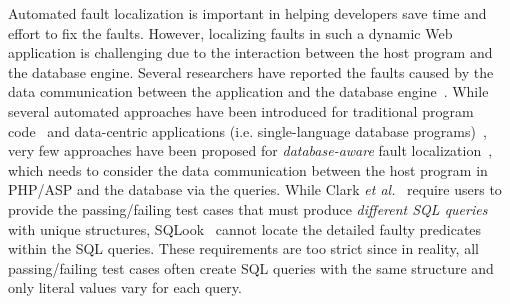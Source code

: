 Automated fault localization is important in helping developers save
time and effort to fix the faults. However, localizing faults in such
a dynamic Web application is challenging due to the interaction
between the host program and the database engine.
Several researchers have reported the faults caused by the data
communication between the application and the database
engine~\cite{ga-ase11,brooks-icst09}. While several automated
approaches have been introduced for traditional program
code~\cite{abreu-ochiai-07, tarantula05,liblit-pldi05} and
data-centric applications (i.e. single-language database
programs)~\cite{dor-issta08,litvak10,saha11}, very few approaches have
been proposed for {\em database-aware} fault
localization~\cite{ga-ase11,icsm13}, which needs to consider the data
communication between the host program in PHP/ASP and the database via
the queries. While Clark {\em et al.}~\cite{ga-ase11} require users to
provide the passing/failing test cases that must produce {\em
  different SQL queries} with unique structures, SQLook~\cite{icsm13}
cannot locate the detailed faulty predicates within the SQL queries.
These requirements are too strict since in reality, all
passing/failing test cases often create SQL queries with the same
structure and only literal values vary for each query.





